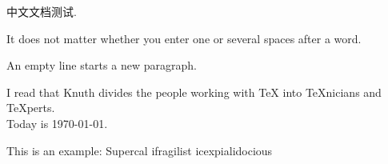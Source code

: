﻿\documentclass[CJK]{cctart}
\begin{document}
中文文档测试.

It does not matter whether you
enter one or several    spaces
after a word.

An empty line starts a new
paragraph.

I read that Knuth divides the
people working with \TeX{} into
\TeX{}nicians and \TeX perts.\\
Today is \today.

This is an %
example: Supercal%
ifragilist%
icexpialidocious
\end{document}
